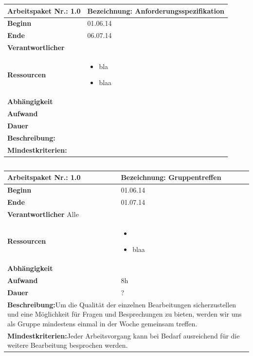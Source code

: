 \documentclass[fontsize=12pt,paper=a4,twoside]{scrartcl}
\begin{document}
\begin{tabular}{|p{5.3cm}|p{9.7cm}|}\hline
	\textbf{Arbeitspaket Nr.:} 1.0 & \textbf{Bezeichnung:} Anforderungsspezifikation\\ \hline \hline
	\textbf{Beginn} & 01.06.14\\ \hline
	\textbf{Ende} & 06.07.14\\ \hline
	\textbf{Verantwortlicher} & \\ \hline
	\textbf{Ressourcen} & \begin{itemize}
		\item bla
		\item blaa
	\end{itemize}    \\ \hline
	\textbf{Abhängigkeit} &\\ \hline
	\textbf{Aufwand} & \\ \hline
	\textbf{Dauer} & \\ \hline
	\multicolumn{2}{|p{15cm}|}{\textbf{Beschreibung:}\newline   }\\ \hline
	\multicolumn{2}{|p{15cm}|}{\textbf{Mindestkriterien:}\newline }\\ \hline
\end{tabular}

\begin{verbatim} 
\end{verbatim}

\begin{tabular}{|p{5.3cm}|p{9.7cm}|}\hline
	\textbf{Arbeitspaket Nr.:} 1.0 & \textbf{Bezeichnung:} Gruppentreffen\\ \hline \hline
	\textbf{Beginn} & 01.06.14\\ \hline
	\textbf{Ende} &  01.07.14\\ \hline
	\textbf{Verantwortlicher} Alle \\ \hline
	\textbf{Ressourcen} & \begin{itemize}
		\item 
		\item blaa
	\end{itemize}    \\ \hline
	\textbf{Abhängigkeit} &\\ \hline
	\textbf{Aufwand} & 8h\\ \hline
	\textbf{Dauer} & ?\\ \hline
	\multicolumn{2}{|p{15cm}|}{\textbf{Beschreibung:}\newline  Um die Qualität der einzelnen Bearbeitungen sicherzustellen und eine Möglichkeit für Fragen und Besprechungen zu bieten, werden wir uns als Gruppe mindestens einmal in der Woche gemeinsam treffen. }\\ \hline
	\multicolumn{2}{|p{15cm}|}{\textbf{Mindestkriterien:}\newline Jeder Arbeitsvorgang kann bei Bedarf ausreichend für die weitere Bearbeitung besprochen werden. }\\ \hline
\end{tabular}
\end{document}
